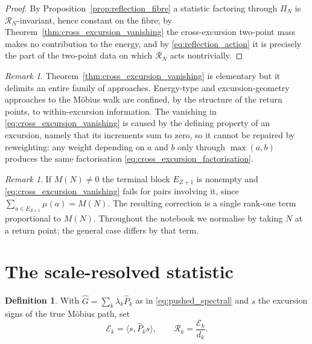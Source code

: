 \documentclass[11pt]{amsart}
\numberwithin{equation}{section}
\theoremstyle{plain}
\theoremstyle{definition}
\newtheorem{definition}[theorem]{Definition}
\theoremstyle{remark}
\newtheorem{remark}[theorem]{Remark}
\begin{document}
\begin{proof}
By Proposition~\ref{prop:reflection_fibre} a statistic factoring
through $\Pi_N$ is $\mathcal{R}_N$-invariant, hence constant on the
fibre; by Theorem~\ref{thm:cross_excursion_vanishing} the
cross-excursion two-point mass makes no contribution to the energy, and
by \eqref{eq:reflection_action} it is precisely the part of the
two-point data on which $\mathcal{R}_N$ acts nontrivially.
\end{proof}

\begin{remark}
\label{rem:blindness_interpretation}
Theorem~\ref{thm:cross_excursion_vanishing} is elementary but it
delimits an entire family of approaches. Energy-type and
excursion-geometry approaches to the M\"obius walk are confined, by the
structure of the return points, to within-excursion information. The
vanishing in \eqref{eq:cross_excursion_vanishing} is caused by the
defining property of an excursion, namely that its increments sum to
zero, so it cannot be repaired by reweighting: any weight depending on
$a$ and $b$ only through $\max(a,b)$ produces the same factorisation
\eqref{eq:cross_excursion_factorisation}.
\end{remark}

\begin{remark}
\label{rem:terminal_block}
If $M(N) \neq 0$ the terminal block $E_{Z+1}$ is nonempty and
\eqref{eq:cross_excursion_vanishing} fails for pairs involving it,
since $\sum_{a \in E_{Z+1}} \mu(a) = M(N)$. The resulting correction is
a single rank-one term proportional to $M(N)$. Throughout the notebook
we normalise by taking $N$ at a return point; the general case differs
by that term.
\end{remark}

\section{The scale-resolved statistic}
\label{sec:scale_resolved}

\begin{definition}
\label{def:scale_resolved_statistic}
With $\widehat{G} = \sum_k \lambda_k \widehat{P}_k$ as in
\eqref{eq:pushed_spectral} and $s$ the excursion signs of the true
M\"obius path, set
\begin{equation}
\mathcal{E}_k = \langle s, \widehat{P}_k s \rangle,
\qquad
\mathcal{R}_k = \frac{\mathcal{E}_k}{d_k}.
\label{eq:scale_resolved_statistic}
\end{equation}
\end{definition}
\end{document}
